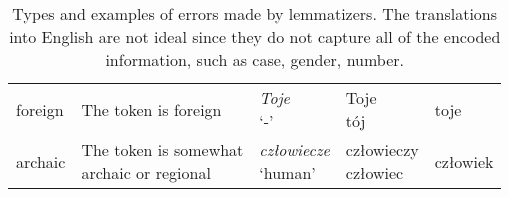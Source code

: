 \begin{table}[H]
\begin{center}
{\begin{tabular}{p{2cm}p{4.5cm}p{3.5cm}p{1.75cm}p{1.75cm}}
foreign & The token is foreign & \makecell[l]{\textit{Toje} \\ `-'} & \makecell[l]{Toje \\ tój} & toje \\

archaic & \makecell[l]{The token is somewhat \\ archaic or regional} & \makecell[l]{\textit{człowiecze} \\ `human'} & \makecell[l]{człowieczy \\ człowiec} & człowiek \\

\bottomrule
\end{tabular}}
\end{center}
\caption{\label{table:error-type-explanations} Types and examples of errors made by lemmatizers. The translations into English are not ideal since they do not capture all of the encoded information, such as case, gender, number.}
\end{table}
\newpage

